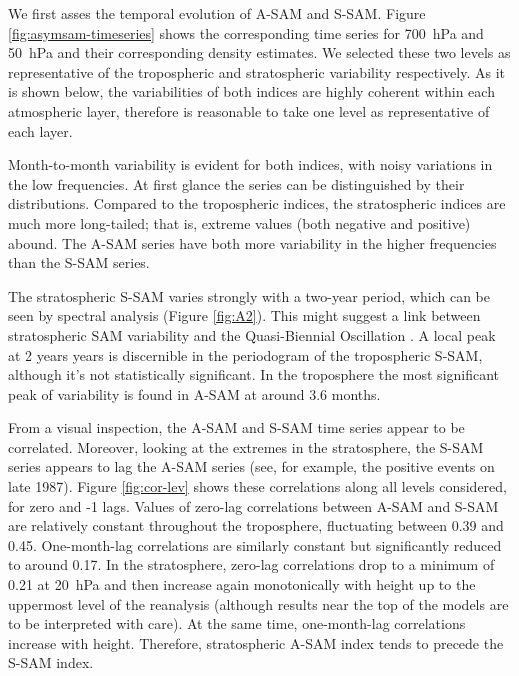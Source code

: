 \documentclass[smallextended]{svjour3}       %
\begin{document}
We first asses the temporal evolution of A\nobreakdash-SAM and S\nobreakdash-SAM. Figure \ref{fig:asymsam-timeseries} shows the corresponding time series for 700~hPa and 50~hPa and their corresponding density estimates. We selected these two levels as representative of the tropospheric and stratospheric variability respectively. As it is shown below, the variabilities of both indices are highly coherent within each atmospheric layer, therefore is reasonable to take one level as representative of each layer.

Month-to-month variability is evident for both indices, with noisy variations in the low frequencies. At first glance the series can be distinguished by their distributions. Compared to the tropospheric indices, the stratospheric indices are much more long-tailed; that is, extreme values (both negative and positive) abound. The A\nobreakdash-SAM series have both more variability in the higher frequencies than the S\nobreakdash-SAM series.

The stratospheric S\nobreakdash-SAM varies strongly with a two-year period, which can be seen by spectral analysis (Figure \ref{fig:A2}). This might suggest a link between stratospheric SAM variability and the Quasi-Biennial Oscillation \citep{baldwin2001b}. A local peak at 2 years years is discernible in the periodogram of the tropospheric S\nobreakdash-SAM, although it's not statistically significant. In the troposphere the most significant peak of variability is found in A\nobreakdash-SAM at around 3.6 months.

From a visual inspection, the A\nobreakdash-SAM and S\nobreakdash-SAM time series appear to be correlated. Moreover, looking at the extremes in the stratosphere, the S\nobreakdash-SAM series appears to lag the A\nobreakdash-SAM series (see, for example, the positive events on late 1987). Figure \ref{fig:cor-lev} shows these correlations along all levels considered, for zero and -1 lags. Values of zero-lag correlations between A\nobreakdash-SAM and S\nobreakdash-SAM are relatively constant throughout the troposphere, fluctuating between 0.39 and 0.45. One-month-lag correlations are similarly constant but significantly reduced to around 0.17. In the stratosphere, zero-lag correlations drop to a minimum of 0.21 at 20~hPa and then increase again monotonically with height up to the uppermost level of the reanalysis (although results near the top of the models are to be interpreted with care). At the same time, one-month-lag correlations increase with height. Therefore, stratospheric A\nobreakdash-SAM index tends to precede the S\nobreakdash-SAM index.
\end{document}
